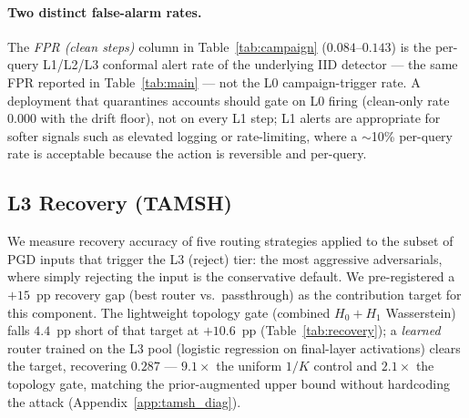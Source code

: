 \paragraph{Two distinct false-alarm rates.}
The \emph{FPR (clean steps)} column in Table~\ref{tab:campaign}
($0.084$--$0.143$) is the per-query L1/L2/L3 conformal alert rate of the
underlying IID detector --- the same FPR reported in
Table~\ref{tab:main} --- not the L0 campaign-trigger rate. A deployment
that quarantines accounts should gate on L0 firing (clean-only rate
$0.000$ with the drift floor), not on every L1 step; L1 alerts are
appropriate for softer signals such as elevated logging or rate-limiting,
where a $\sim$10\% per-query rate is acceptable because the action is
reversible and per-query.

\subsection{L3 Recovery (TAMSH)}
\label{sec:recovery}

We measure recovery accuracy of five routing strategies applied to the
subset of PGD inputs that trigger the L3 (reject) tier: the most aggressive
adversarials, where simply rejecting the input is the conservative default.
We pre-registered a $+15$~pp recovery gap (best router vs.\
passthrough) as the contribution target for this component. The lightweight
topology gate (combined $H_0{+}H_1$ Wasserstein) falls $4.4$~pp short of
that target at $+10.6$~pp (Table~\ref{tab:recovery}); a \emph{learned}
router trained on the L3 pool (logistic regression on final-layer
activations) clears the target, recovering $0.287$ --- $9.1\times$ the
uniform $1/K$ control and $2.1\times$ the topology gate, matching the
prior-augmented upper bound without hardcoding the attack
(Appendix~\ref{app:tamsh_diag}).

\begin{table}[h]
\centering
\small

\caption{%
  L3-recovery on PGD adversarials (5 seeds, $n_{L3} \approx 792$ per
  seed; mean trigger rate $0.792$ within sanity band $[0.10, 0.82]$). The
  \texttt{tamsh} row is the lightweight topology gate (combined
  $H_0{+}H_1$), which delivers $+10.6$~pp over passthrough, falling
  $4.4$~pp short of the pre-registered $+15$~pp target; a learned router
  trained on the L3 pool clears the target (Appendix~\ref{app:tamsh_diag}).
  The \texttt{tamsh\_force} row is a prior-augmented upper-bound analysis
  (always-route to PGD specialist, not a learned policy); the oracle
  ceiling is per-input best-of-$K$ on the same L3 subset.
}
\label{tab:recovery}
\end{table}

